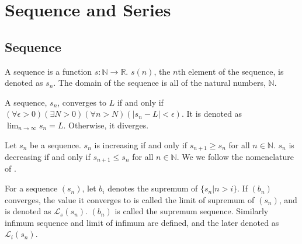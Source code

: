 \documentclass[../note.tex]{subfiles}
\begin{document}
\section{Sequence and Series}
\subsection{Sequence}
\begin{definition}[Sequence]
	A sequence is a function $s: \mathbb{N} \to \mathbb{R}$. $s(n)$, the $n$th element of the sequence, is denoted as $s_n$.
	The domain of the sequence is all of the natural numbers, $\mathbb{N}$.
\end{definition}

\begin{definition}
	A sequence, $s_n$, converges to $L$ if and only if $(\forall \epsilon > 0)(\exists N>0)(\forall n>N)(|s_n-L|<\epsilon)$. It is denoted as $\lim_{n\to \infty}s_n = L$.
	Otherwise, it diverges.
\end{definition}


\begin{definition}
	Let $s_n$ be a sequence. $s_n$ is increasing if and only if $s_{n+1} \geq s_n$ for all $n \in \mathbb{N}$. 
	$s_n$ is decreasing if and only if $s_{n+1} \leq s_n$ for all $n \in \mathbb{N}$. We we follow the nomenclature of \cite{Ross}.
\end{definition}

\begin{definition}\label{def:limiSupremum}
	For a sequence $(s_n)$, let $b_i$ denotes the supremum of $\{s_n|n>i\}$.
	If $(b_n)$ converges, the value it converges to is called the limit of supremum of $(s_n)$, and is denoted as $\mathcal{L}_s (s_n)$. 
	$(b_n)$ is called the supremum sequence.
	Similarly infimum sequence and limit of infimum are defined, and the later denoted as $\mathcal{L}_i(s_n)$. 
\end{definition}
\end{document}
